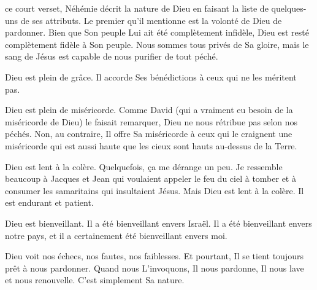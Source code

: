  ce court verset, Néhémie décrit la nature de Dieu
 en faisant la liste de quelques-uns de ses attributs.
 Le premier qu'il mentionne est la volonté de Dieu de pardonner.
 Bien que Son peuple Lui ait été complètement infidèle,
 Dieu est resté complètement fidèle à Son peuple.
 Nous sommes tous privés de Sa gloire,
 mais le sang de Jésus est capable de nous purifier de tout péché.


Dieu est plein de grâce.
 Il accorde Ses bénédictions à ceux qui ne les méritent pas.

Dieu est plein de miséricorde.
 Comme David (qui a vraiment eu besoin de la miséricorde de Dieu)
 le faisait remarquer, Dieu ne nous rétribue pas selon nos péchés.
 Non, au contraire, Il offre Sa miséricorde à ceux qui le craignent
 \ocadr{}une miséricorde qui est aussi haute que les cieux sont hauts
 au-dessus de la Terre.

Dieu est lent à la colère. Quelquefois, ça me dérange un peu.
 Je ressemble beaucoup à Jacques et Jean qui voulaient appeler
 le feu du ciel à tomber et à consumer les samaritains qui insultaient Jésus.
 Mais Dieu est lent à la colère. Il est endurant et patient.

Dieu est bienveillant. Il a été bienveillant envers Israël.
 Il a été bienveillant envers notre pays,
 et il a certainement été bienveillant envers moi.

Dieu voit nos échecs, nos fautes, nos faiblesses.
 Et pourtant, Il se tient toujours prêt à nous pardonner.
 Quand nous L'invoquons, Il nous pardonne,
 Il nous lave et nous renouvelle. C'est simplement Sa nature.

\dvrule







